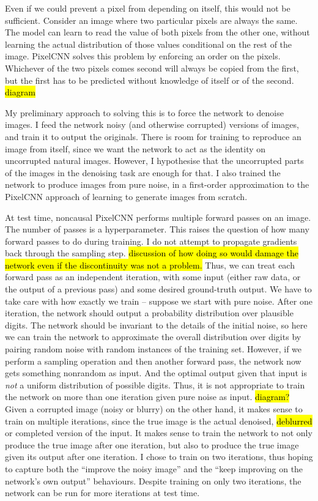 \documentclass[10pt,a4paper]{article}
\newcommand{\nquote}[1]{``{#1}''}
\begin{document}
Even if we could prevent a pixel from depending on itself, this would not be sufficient. Consider an image where two particular pixels are always the same. The model can learn to read the value of both pixels from the other one, without learning the actual distribution of those values conditional on the rest of the image. PixelCNN solves this problem by enforcing an order on the pixels. Whichever of the two pixels comes second will always be copied from the first, but the first has to be predicted without knowledge of itself or of the second. \hl{diagram}

My preliminary approach to solving this is to force the network to denoise images. I feed the network noisy (and otherwise corrupted) versions of images, and train it to output the originals. There is room for training to reproduce an image from itself, since we want the network to act as the identity on uncorrupted natural images. However, I hypothesise that the uncorrupted parts of the images in the denoising task are enough for that. I also trained the network to produce images from pure noise, in a first-order approximation to the PixelCNN approach of learning to generate images from scratch.

At test time, noncausal PixelCNN performs multiple forward passes on an image. The number of passes is a hyperparameter. This raises the question of how many forward passes to do during training. I do not attempt to propagate gradients back through the sampling step. \hl{discussion of how doing so would damage the network even if the discontinuity was not a problem.} Thus, we can treat each forward pass as an independent iteration, with some input (either raw data, or the output of a previous pass) and some desired ground-truth output. We have to take care with how exactly we train -- suppose we start with pure noise. After one iteration, the network should output a probability distribution over plausible digits. The network should be invariant to the details of the initial noise, so here we can train the network to approximate the overall distribution over digits by pairing random noise with random instances of the training set. However, if we perform a sampling operation and then another forward pass, the network now gets something nonrandom as input. And the optimal output given that input is \emph{not} a uniform distribution of possible digits. Thus, it is not appropriate to train the network on more than one iteration given pure noise as input. \hl{diagram?} Given a corrupted image (noisy or blurry) on the other hand, it makes sense to train on multiple iterations, since the true image is the actual denoised, \hl{deblurred} or completed version of the input. It makes sense to train the network to not only produce the true image after one iteration, but also to produce the true image given its output after one iteration. I chose to train on two iterations, thus hoping to capture both the \nquote{improve the noisy image} and the \nquote{keep improving on the network's own output} behaviours. Despite training on only two iterations, the network can be run for more iterations at test time.
  
\end{document}
